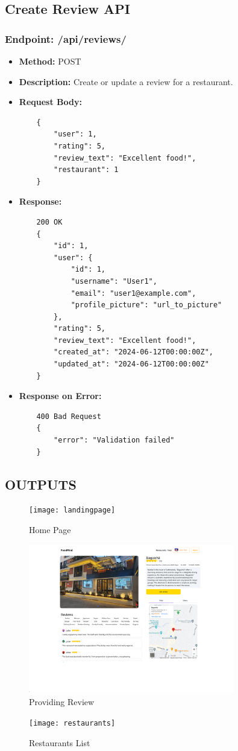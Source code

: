 \subsection{Create Review API}

\subsubsection{Endpoint: /api/reviews/}
\begin{itemize}
    \item \textbf{Method:} POST
    \item \textbf{Description:} Create or update a review for a restaurant.
    \item \textbf{Request Body:}
    \begin{verbatim}
    {
        "user": 1,
        "rating": 5,
        "review_text": "Excellent food!",
        "restaurant": 1
    }
    \end{verbatim}
    \item \textbf{Response:}
    \begin{verbatim}
    200 OK
    {
        "id": 1,
        "user": {
            "id": 1,
            "username": "User1",
            "email": "user1@example.com",
            "profile_picture": "url_to_picture"
        },
        "rating": 5,
        "review_text": "Excellent food!",
        "created_at": "2024-06-12T00:00:00Z",
        "updated_at": "2024-06-12T00:00:00Z"
    }
    \end{verbatim}
    \item \textbf{Response on Error:}
    \begin{verbatim}
    400 Bad Request
    {
        "error": "Validation failed"
    }
    \end{verbatim}
\end{itemize}
\pagebreak

\subsection{OUTPUTS}

\begin{figure}[h]
	\texttt{[image: landingpage]}
	\centering
	\caption{Home Page}
	\label{fig:Home Page}
\end{figure}

\vspace{7mm}
\begin{figure}[h]
	\includegraphics[width=0.8\textwidth]{reviewsdiag}
	\centering
	\caption{Providing Review}
	\label{fig:Review}
\end{figure}


\begin{figure}[h]
	\texttt{[image: restaurants]}
	\centering
	\caption{Restaurants List}
	\label{fig:Restaurant}
\end{figure}
